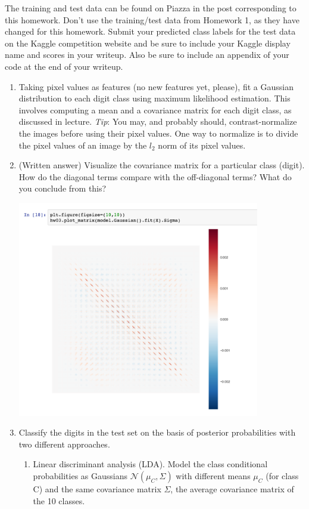 \documentclass{article}
\renewcommand{\N}{\mathcal{N}}
\begin{document}
\noindent
The training and test data can be found on Piazza in the post corresponding to this homework. Don’t use the training/test data from Homework 1, as they have changed for this homework. Submit your predicted class labels for the test data on the Kaggle competition website and be sure to include your Kaggle display name and scores in your writeup. Also be sure to include an appendix of your code at the end of your writeup.

\begin{enumerate}[label=(\alph*)]
\item Taking pixel values as features (no new features yet, please), fit a
  Gaussian distribution to each digit class using maximum likelihood
  estimation. This involves computing a mean and a covariance matrix for each
  digit class, as discussed in lecture. \emph{Tip}: You may, and probably
  should, contrast-normalize the images before using their pixel values. One
  way to normalize is to divide the pixel values of an image by the $l_2$ norm
  of its pixel values.
\item (Written answer) Visualize the covariance matrix for a particular class
  (digit). How do the diagonal terms compare with the off-diagonal terms? What
  do you conclude from this?
    \begin{mdframed}
      \includegraphics[width=300pt]{img/hw03_6b.png}
    \end{mdframed}

  \item Classify the digits in the test set on the basis of posterior
    probabilities with two different approaches.
    \begin{enumerate}[label=(\roman*)]
        \item Linear discriminant analysis (LDA). Model the class conditional probabilities as Gaussians $\N(\mu_C, \Sigma)$ with different means $\mu_C$ (for class C) and the same covariance matrix $\Sigma$, the average covariance matrix of the 10 classes. \\


\end{enumerate}
\end{enumerate}
\end{document}
